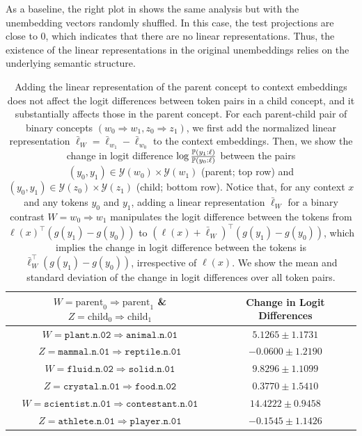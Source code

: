 \documentclass{article}
\newcommand{\ConceptValue}[1]{\texttt{#1}}
\newcommand{\ConceptDirMath}[2]{#1 \Rightarrow #2}
\newcommand{\yquad}{\mathcal{Y}}
\begin{document}
As a baseline, the right plot in  shows the same analysis but with the unembedding vectors randomly shuffled.
In this case, the test projections are close to 0, which indicates that there are no linear representations. 
Thus, the existence of the linear representations in the original unembeddings relies on the underlying semantic structure.

\begin{table}[t]
  \caption{Adding the linear representation of the parent concept to context embeddings does not affect the logit differences between token pairs in a child concept, and it substantially affects those in the parent concept.
  For each parent-child pair of binary concepts $(\ConceptDirMath{w_0}{w_1}, \ConceptDirMath{z_0}{z_1})$, we first add the normalized linear representation $\bar\ell_W = \bar\ell_{w_1} - \bar\ell_{w_0}$ to the context embeddings.
  Then, we show the change in logit difference $\log\frac{\Pr(y_1 \given \ell)}{\Pr(y_0 \given \ell)}$ between the pairs $(y_0, y_1)\in \yquad(w_0) \times \yquad(w_1)$ (parent; top row) and $(y_0, y_1)\in \yquad(z_0) \times \yquad(z_1)$ (child; bottom row).
  Notice that, for any context $x$ and any tokens $y_0$ and $y_1$, adding a linear representation $\bar\ell_W$ for a binary contrast $W = w_0 \Rightarrow w_1$ manipulates the logit difference between the tokens from $\ell(x)^\top (g(y_1) - g(y_0))$ to $(\ell(x) + \bar{\ell}_{W})^\top (g(y_1) - g(y_0))$, which implies the change in logit difference between the tokens is $\bar{\ell}_{W}^\top (g(y_1) - g(y_0))$, irrespective of $\ell(x)$.
  We show the mean and standard deviation of the change in logit differences over all token pairs.
  }
  \label{tbl:logit_diff}
  \centering
  \small
  \begin{tabular}{cc}
    \toprule
    $W=\text{parent}_0\Rightarrow \text{parent}_1$ \& $Z = \text{child}_0\Rightarrow \text{child}_1$ & Change in Logit Differences \\
    \midrule
    $W=\ConceptValue{plant.n.02}\Rightarrow \ConceptValue{animal.n.01}$   & $5.1265 \pm 1.1731$\\
    $Z=\ConceptValue{mammal.n.01}\Rightarrow \ConceptValue{reptile.n.01}$   &$-0.0600 \pm 1.2190$ \\
    \midrule
    $W=\ConceptValue{fluid.n.02}\Rightarrow \ConceptValue{solid.n.01}$   & $9.8296 \pm 1.1099$\\
    $Z=\ConceptValue{crystal.n.01}\Rightarrow \ConceptValue{food.n.02}$   &$0.3770 \pm 1.5410$ \\
    \midrule
    $W=\ConceptValue{scientist.n.01}\Rightarrow \ConceptValue{contestant.n.01}$   & $14.4222 \pm 0.9458$\\
    $Z=\ConceptValue{athlete.n.01}\Rightarrow \ConceptValue{player.n.01}$   &$-0.1545 \pm 1.1426$ \\
    \bottomrule
  \end{tabular}
\end{table}
\end{document}
